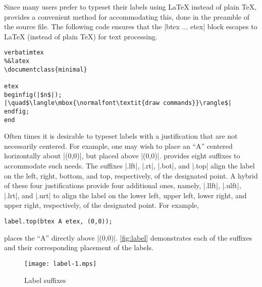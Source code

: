 Since many \MP{} users prefer to typeset their labels using \LaTeX{}
instead of plain \TeX, \MP{} provides a convenient method for
accommodating this, done in the preamble of the \MP{} source file.  The
following code ensures that the |btex ... etex| block escapes to
\LaTeX{} (instead of plain \TeX) for text processing.

\begin{lstlisting}[style=MP]
verbatimtex
%&latex
\documentclass{minimal}

etex
beginfig(|$n$|);
|\quad$\langle\mbox{\normalfont\textit{draw commands}}\rangle$|
endfig;
end
\end{lstlisting}

Often times it is desirable to typeset labels with a justification that
are not necessarily centered.  For example, one may wish to place an
``A'' centered horizontally about |(0,0)|, but placed above
|(0,0)|. \MP{} provides eight suffixes to accommodate such needs.  The
suffixes |.lft|, |.rt|, |.bot|, and |.top| align the label on the left,
right, bottom, and top, respectively, of the designated point.  A hybrid
of these four justifications provide four additional ones, namely,
|.llft|, |.ulft|, |.lrt|, and |.urt| to align the label on the lower
left, upper left, lower right, and upper right, respectively, of the
designated point.  For example,

\begin{lstlisting}[style=MP]
label.top(btex A etex, (0,0));
\end{lstlisting}
places the ``A'' directly above |(0,0)|.  \autoref{fig:label}
demonstrates each of the suffixes and their corresponding placement of
the labels.

\begin{figure}
  \hfill%
  \texttt{[image: label-1.mps]}
  \hfill%
  \hfill\mbox{}
  \caption{Label suffixes}
  \label{fig:label}
\end{figure}
